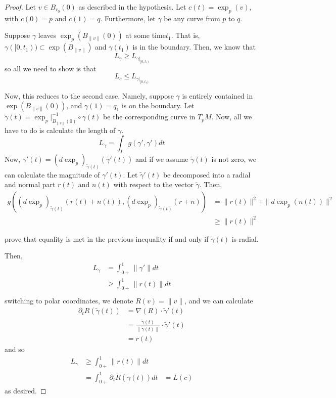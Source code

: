 \documentclass[../main.tex]{subfiles}
\begin{document}
\begin{proof}
    Let $v\in B_{r_0}(0)$ as described in the hypothesis. Let $c(t) =
    \exp_p(v)$, with $c(0)=p$ and $c(1)=q$. Furthermore, let $\gamma$ be any
    curve from $p$ to $q$.

    Suppose $\gamma$ leaves $\exp_p(B_{\|v\|}(0))$ at some time$t_1$. That is,
    $\gamma([0,t_1))\subset\exp(B_{\|v\|})$ and $\gamma(t_1)$ is in the
    boundary. Then, we know that
    \[
        L_{\gamma}\geq L_{\gamma|_{[0,t_1)}}
    \]
    so all we need to show is that
    \[
        L_c\leq L_{\gamma|_{[0,t_1)}}
    \]

    Now, this reduces to the second case. Namely, suppose $\gamma$ is entirely
    contained in $\exp(B_{\|v\|}(0))$, and $\gamma(1)=q_1$ is on the boundary.
    Let $\tilde{\gamma}(t) = \exp_p|_{B_{\|v\|}(0)}^{-1}\circ\gamma(t)$ be the
    corresponding curve in $T_pM$. Now, all we have to do is calculate the
    length of $\gamma$.
    \[
        L_{\gamma} = \int_Ig(\gamma',\gamma')dt
    \]
    Now,
    $\gamma'(t) = (d\exp_p)_{\tilde{\gamma}(t)}(\tilde{\gamma}'(t))$
    and if we assume $\tilde{\gamma}(t)$ is not zero, we can calculate the
    magnitude of $\gamma'(t)$. Let $\tilde{\gamma}'(t)$ be decomposed into a
    radial and normal part $r(t)$ and $n(t)$ with
    respect to the vector $\tilde{\gamma}$. Then,
    \[
        \begin{aligned}
        g((d\exp_p)_{\tilde{\gamma}(t)}(r(t)+n(t)),(d\exp_p)_{\tilde{\gamma}(t)}(r+n))
        &= \|r(t)\|^2 + \|d\exp_p(n(t))\|^2\\
            &\geq \|r(t)\|^2
        \end{aligned}
    \]
\begin{hw}
    prove that equality is met in the previous inequality if and only if
    $\tilde{\gamma}(t)$ is radial.
\end{hw}
    Then,
    \[
        \begin{aligned}
            L_{\gamma} &= \int_{0+}^1 \|\gamma'\|dt\\
            &\geq \int_{0+}^1\|r(t)\|dt\\
        \end{aligned}
    \]
    switching to polar coordinates, we denote $R(v) = \|v\|$, and we can
    calculate 
    \[
        \begin{aligned}
        \partial_t R(\tilde{\gamma}(t)) &= \nabla (R)\cdot\tilde{\gamma}'(t)\\
            &=
            \frac{\tilde{\gamma}(t)}{\|\tilde{\gamma}(t)\|}\cdot\tilde{\gamma}'(t)\\
            &= r(t)
        \end{aligned}
    \]
    and so
    \[
        \begin{aligned}
            L_{\gamma} &\geq \int_{0+}^1\|r(t)\|dt\\
                        &= \int_{0+}^1\partial_tR(\tilde{\gamma}(t))dt
                        &=L(c)
        \end{aligned}
    \]
    as desired.
\end{proof}
\end{document}
